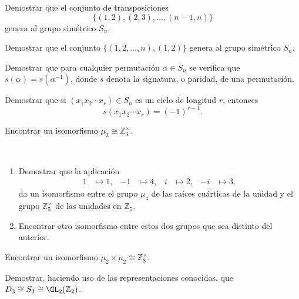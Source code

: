 \begin{ejercicio}\label{ej:2.21}
    Demostrar que el conjunto de transposiciones
    $$\{(1, 2), (2, 3), \ldots, (n - 1, n)\}$$
    genera al grupo simétrico $S_n$.
\end{ejercicio}

\begin{ejercicio}\label{ej:2.22}
    Demostrar que el conjunto $\{(1, 2, \ldots, n), (1, 2)\}$ genera al grupo simétrico $S_n$.
\end{ejercicio}

\begin{ejercicio}\label{ej:2.23}
    Demostrar que para cualquier permutación $\alpha \in S_n$ se verifica que $s(\alpha) = s(\alpha^{-1})$, donde $s$ denota la signatura, o paridad, de una permutación.
\end{ejercicio}

\begin{ejercicio}\label{ej:2.24}
    Demostrar que si $(x_1x_2 \cdots x_r) \in S_n$ es un ciclo de longitud $r$, entonces
    $$s(x_1x_2 \cdots x_r) = (-1)^{r - 1}.$$
\end{ejercicio}

\begin{ejercicio}\label{ej:2.25}
    Encontrar un isomorfismo $\mu_2 \cong \mathbb{Z}^{\times}_3$.
\end{ejercicio}

\begin{ejercicio}\label{ej:2.26}~
    \begin{enumerate}
        \item Demostrar que la aplicación
        \begin{align*}
            1 &\mapsto 1, & -1 &\mapsto 4, & i &\mapsto 2, & -i &\mapsto 3,
        \end{align*}
        da un isomorfismo entre el grupo $\mu_4$ de las raíces cuárticas de la unidad y el grupo $\mathbb{Z}^{\times}_5$ de las unidades en $\mathbb{Z}_5$.
        \item Encontrar otro isomorfismo entre estos dos grupos que sea distinto del anterior.
    \end{enumerate}
\end{ejercicio}

\begin{ejercicio}\label{ej:2.27}
    Encontrar un isomorfismo $\mu_2 \times \mu_2 \cong \mathbb{Z}^{\times}_8$.
\end{ejercicio}

\begin{ejercicio}\label{ej:2.28}
    Demostrar, haciendo uso de las representaciones conocidas, que $D_3 \cong S_3 \cong \GL_2(\mathbb{Z}_2)$.
\end{ejercicio}

